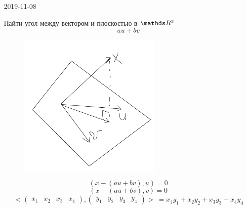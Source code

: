 \documentclass[12pt, fleqn]{article}
\begin{document}
\begin{lect}{2019-11-08}
    \begin{Task}[7.2]
        Найти угол между вектором и плоскостью в $\R^3$
        \[au + bv\]
        \begin{figure}[h]
            \includegraphics[width=7cm]{pics/5.png}
            \centering
        \end{figure}
        \[(x - (au + bv), u) = 0\]
        \[(x - (au + bv), v) = 0\]
        \[<\begin{pmatrix}
            x_1 & x_2 & x_3 & x_4
        \end{pmatrix}, \begin{pmatrix}
            y_1 & y_2 & y_3 & y_4
        \end{pmatrix}> \ = x_1y_1 + x_2y_2 + x_3y_3 + x_4y_4\]
    \end{Task}
\end{lect}
\end{document}
